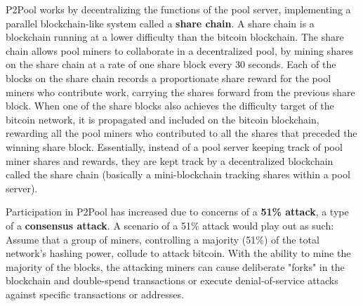 \documentclass{article}
\begin{document}
    P2Pool works by decentralizing the functions of the pool server, implementing a parallel blockchain-like system called a \textbf{share chain}. A share chain is a blockchain running at a lower difficulty than the bitcoin blockchain. The share chain allows pool miners to collaborate in a decentralized pool, by mining shares on the share chain at a rate of one share block every 30 seconds. Each of the blocks on the share chain records a proportionate share reward for the pool miners who contribute work, carrying the shares forward from the previous share block. When one of the share blocks also achieves the difficulty target of the bitcoin network, it is propagated and included on the bitcoin blockchain, rewarding all the pool miners who contributed to all the shares that preceded the winning share block. Essentially, instead of a pool server keeping track of pool miner shares and rewards, they are kept track by a decentralized blockchain called the share chain (basically a mini-blockchain tracking shares within a pool server).

    Participation in P2Pool has increased due to concerns of a \textbf{51\% attack}, a type of a \textbf{consensus attack}. A scenario of a 51\% attack would play out as such: Assume that a group of miners, controlling a majority (51\%) of the total network's hashing power, collude to attack bitcoin. With the ability to mine the majority of the blocks, the attacking miners can cause deliberate "forks" in the blockchain and double-spend transactions or execute denial-of-service attacks against specific transactions or addresses.
\end{document}
